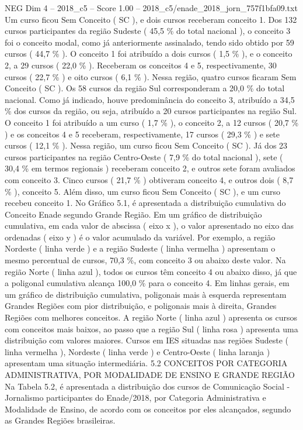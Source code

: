 \begin{textsample}{NEG Dim 4 – 2018\_c5 – Score 1.00 – 2018\_c5/enade\_2018\_jorn\_757f1bfa09.txt}
Um curso ficou Sem Conceito ( SC ), e dois cursos receberam conceito 1.
Dos 132 cursos participantes da região Sudeste ( 45,5 \% do total nacional ), o conceito 3 foi o conceito modal, como já anteriormente assinalado, tendo sido obtido por 59 cursos ( 44,7 \% ).
O conceito 1 foi atribuído a dois cursos ( 1,5 \% ), e o conceito 2, a 29 cursos ( 22,0 \% ).
Receberam os conceitos 4 e 5, respectivamente, 30 cursos ( 22,7 \% ) e oito cursos ( 6,1 \% ).
Nessa região, quatro cursos ficaram Sem Conceito ( SC ).
Os 58 cursos da região Sul corresponderam a 20,0 \% do total nacional.
Como já indicado, houve predominância do conceito 3, atribuído a 34,5 \% dos cursos da região, ou seja, atribuído a 20 cursos participantes na região Sul.
O conceito 1 foi atribuído a um curso ( 1,7 \% ), o conceito 2, a 12 cursos ( 20,7 \% ) e os conceitos 4 e 5 receberam, respectivamente, 17 cursos ( 29,3 \% ) e sete cursos ( 12,1 \% ).
Nessa região, um curso ficou Sem Conceito ( SC ).
Já dos 23 cursos participantes na região Centro-Oeste ( 7,9 \% do total nacional ), sete ( 30,4 \% em termos regionais ) receberam conceito 2, e outros sete foram avaliados com conceito 3.
Cinco cursos ( 21,7 \% ) obtiveram conceito 4, e outros dois ( 8,7 \% ), conceito 5.
Além disso, um curso ficou Sem Conceito ( SC ), e um curso recebeu conceito 1.
No Gráfico 5.1, é apresentada a distribuição cumulativa do Conceito Enade segundo Grande Região.
Em um gráfico de distribuição cumulativa, em cada valor de abscissa ( eixo x ), o valor apresentado no eixo das ordenadas ( eixo y ) é o valor acumulado da variável.
Por exemplo, a região Nordeste ( linha verde ) e a região Sudeste ( linha vermelha ) apresentam o mesmo percentual de cursos, 70,3 \%, com conceito 3 ou abaixo deste valor.
Na região Norte ( linha azul ), todos os cursos têm conceito 4 ou abaixo disso, já que a poligonal cumulativa alcança 100,0 \% para o conceito 4.
Em linhas gerais, em um gráfico de distribuição cumulativa, poligonais mais à esquerda representam Grandes Regiões com pior distribuição, e poligonais mais à direita, Grandes Regiões com melhores conceitos.
A região Norte ( linha azul ) apresenta os cursos com conceitos mais baixos, ao passo que a região Sul ( linha rosa ) apresenta uma distribuição com valores maiores.
Cursos em IES situadas nas regiões Sudeste ( linha vermelha ), Nordeste ( linha verde ) e Centro-Oeste ( linha laranja ) apresentam uma situação intermediária. 5.2 CONCEITOS POR CATEGORIA ADMINISTRATIVA, POR MODALIDADE DE ENSINO E GRANDE REGIÃO Na Tabela 5.2, é apresentada a distribuição dos cursos de Comunicação Social - Jornalismo participantes do Enade/2018, por Categoria Administrativa e Modalidade de Ensino, de acordo com os conceitos por eles alcançados, segundo as Grandes Regiões brasileiras.

\end{textsample}
